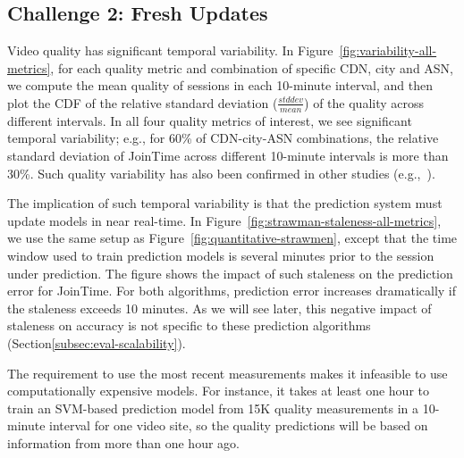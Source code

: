 \subsection{Challenge 2: Fresh Updates}
\label{subsec:fresh}

Video quality has significant temporal variability.
In Figure~\ref{fig:variability-all-metrics},
for each quality metric and combination of specific 
CDN, city and ASN, %
we compute the mean quality of sessions in each 
10-minute interval, and then plot the CDF of the 
relative standard deviation ($\frac{stddev}{mean}$)
of the quality across different intervals.
In all four quality metrics of interest, we see 
significant temporal variability;
e.g., for 60\% of CDN-city-ASN combinations, 
the relative standard deviation of JoinTime across 
different 10-minute intervals is more than 30\%.
Such quality variability has also been confirmed in 
other studies (e.g.,~\cite{sigcomm12conviva}).

The implication of such temporal variability
is that the prediction system must update models 
in near real-time.
In Figure~\ref{fig:strawman-staleness-all-metrics}, 
we use the same setup as 
Figure~\ref{fig:quantitative-strawmen}, except that the 
time window used to train prediction models is 
several minutes prior to the session under prediction.
The figure shows the impact of such staleness on 
the prediction error for JoinTime. 
For both algorithms, prediction error increases 
dramatically if the staleness exceeds 10 minutes. 
As we will see later, this negative impact of staleness 
on accuracy is not specific to these prediction 
algorithms (Section\ref{subsec:eval-scalability}). 



The requirement to use the most recent measurements
makes it infeasible to use computationally expensive models.
For instance, it takes at least one 
hour to train an SVM-based prediction model from 15K
quality measurements in a 10-minute interval for 
one video site, so the quality predictions 
will be based on information from more than one hour ago.


